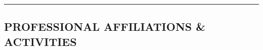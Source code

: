 \documentclass[10pt,letterpaper,MMMyyyy,nonstop]{simpleresumecv}
\begin{document}

% 



\hrule
\vspace{-0.4em}
\subsection*{PROFESSIONAL AFFILIATIONS \& ACTIVITIES}
\end{document}
